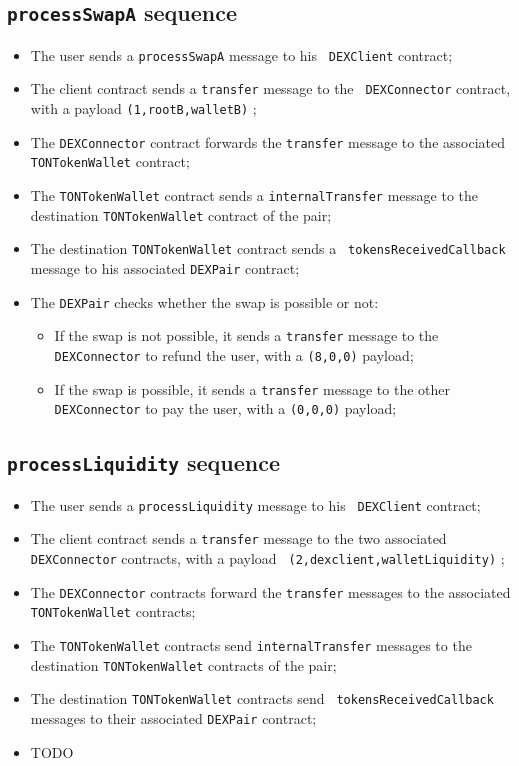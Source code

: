\subsection{{\tt processSwapA} sequence}

\begin{itemize}
\item The user sends a {\tt processSwapA} message to his {\tt
  DEXClient} contract;
\item The client contract sends a {\tt transfer} message to the {\tt
  DEXConnector} contract, with a payload {\tt (1,rootB,walletB)} ;
\item The {\tt DEXConnector} contract forwards the {\tt transfer}
  message to the associated {\tt TONTokenWallet} contract;
\item The {\tt TONTokenWallet} contract sends a {\tt internalTransfer}
  message to the destination {\tt TONTokenWallet} contract of the
  pair;
\item The destination {\tt TONTokenWallet} contract sends a {\tt
  tokensReceivedCallback} message to his associated {\tt DEXPair}
  contract;
\item The {\tt DEXPair} checks whether the swap is possible or not:
  \begin{itemize}
  \item If the swap is not possible, it sends a {\tt transfer} message
    to the {\tt DEXConnector} to refund the user, with a {\tt (8,0,0)}
    payload;
  \item If the swap is possible, it sends a {\tt transfer} message to
    the other {\tt DEXConnector} to pay the user, with a {\tt (0,0,0)}
    payload;
  \end{itemize}
\end{itemize}

\subsection{{\tt processLiquidity} sequence}

\begin{itemize}
\item The user sends a {\tt processLiquidity} message to his {\tt
  DEXClient} contract;
\item The client contract sends a {\tt transfer} message to the two
  associated {\tt DEXConnector} contracts, with a payload {\tt
    (2,dexclient,walletLiquidity)} ;
\item The {\tt DEXConnector} contracts forward the {\tt transfer}
  messages to the associated {\tt TONTokenWallet} contracts;
\item The {\tt TONTokenWallet} contracts send {\tt internalTransfer}
  messages to the destination {\tt TONTokenWallet} contracts of the
  pair;
\item The destination {\tt TONTokenWallet} contracts send {\tt
  tokensReceivedCallback} messages to their associated {\tt DEXPair}
  contract;
\item TODO
\end{itemize}

